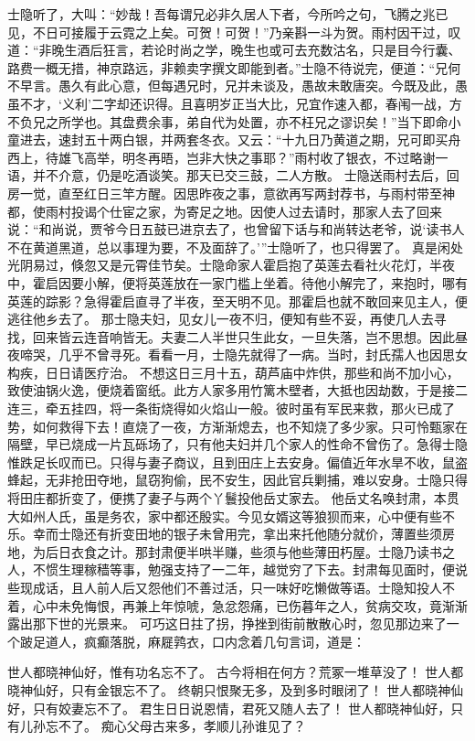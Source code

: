 \documentclass[12pt,oneside]{book}
\begin{document}
士隐听了，大叫：“妙哉！吾每谓兄必非久居人下者，今所吟之句，飞腾之兆已见，不日可接履于云霓之上矣。可贺！可贺！”乃亲斟一斗为贺。雨村因干过，叹道：“非晚生酒后狂言，若论时尚之学，晚生也或可去充数沽名，只是目今行囊、路费一概无措，神京路远，非赖卖字撰文即能到者。”士隐不待说完，便道：“兄何不早言。愚久有此心意，但每遇兄时，兄并未谈及，愚故未敢唐突。今既及此，愚虽不才，‘义利’二字却还识得。且喜明岁正当大比，兄宜作速入都，春闱一战，方不负兄之所学也。其盘费余事，弟自代为处置，亦不枉兄之谬识矣！”当下即命小童进去，速封五十两白银，并两套冬衣。又云：“十九日乃黄道之期，兄可即买舟西上，待雄飞高举，明冬再晤，岂非大快之事耶？”雨村收了银衣，不过略谢一语，并不介意，仍是吃酒谈笑。那天已交三鼓，二人方散。
士隐送雨村去后，回房一觉，直至红日三竿方醒。因思昨夜之事，意欲再写两封荐书，与雨村带至神都，使雨村投谒个仕宦之家，为寄足之地。因使人过去请时，那家人去了回来说：“和尚说，贾爷今日五鼓已进京去了，也曾留下话与和尚转达老爷，说‘读书人不在黄道黑道，总以事理为要，不及面辞了。’”士隐听了，也只得罢了。
真是闲处光阴易过，倏忽又是元霄佳节矣。士隐命家人霍启抱了英莲去看社火花灯，半夜中，霍启因要小解，便将英莲放在一家门槛上坐着。待他小解完了，来抱时，哪有英莲的踪影？急得霍启直寻了半夜，至天明不见。那霍启也就不敢回来见主人，便逃往他乡去了。
那士隐夫妇，见女儿一夜不归，便知有些不妥，再使几人去寻找，回来皆云连音响皆无。夫妻二人半世只生此女，一旦失落，岂不思想。因此昼夜啼哭，几乎不曾寻死。看看一月，士隐先就得了一病。当时，封氏孺人也因思女构疾，日日请医疗治。
不想这日三月十五，葫芦庙中炸供，那些和尚不加小心，致使油锅火逸，便烧着窗纸。此方人家多用竹篱木壁者，大抵也因劫数，于是接二连三，牵五挂四，将一条街烧得如火焰山一般。彼时虽有军民来救，那火已成了势，如何救得下去！直烧了一夜，方渐渐熄去，也不知烧了多少家。只可怜甄家在隔壁，早已烧成一片瓦砾场了，只有他夫妇并几个家人的性命不曾伤了。急得士隐惟跌足长叹而已。只得与妻子商议，且到田庄上去安身。偏值近年水旱不收，鼠盗蜂起，无非抢田夺地，鼠窃狗偷，民不安生，因此官兵剿捕，难以安身。士隐只得将田庄都折变了，便携了妻子与两个丫鬟投他岳丈家去。
他岳丈名唤封肃，本贯大如州人氏，虽是务农，家中都还殷实。今见女婿这等狼狈而来，心中便有些不乐。幸而士隐还有折变田地的银子未曾用完，拿出来托他随分就价，薄置些须房地，为后日衣食之计。那封肃便半哄半赚，些须与他些薄田朽屋。士隐乃读书之人，不惯生理稼穑等事，勉强支持了一二年，越觉穷了下去。封肃每见面时，便说些现成话，且人前人后又怨他们不善过活，只一味好吃懒做等语。士隐知投人不着，心中未免悔恨，再兼上年惊唬，急忿怨痛，已伤暮年之人，贫病交攻，竟渐渐露出那下世的光景来。
可巧这日拄了拐，挣挫到街前散散心时，忽见那边来了一个跛足道人，疯癫落脱，麻屣鹑衣，口内念着几句言词，道是：

世人都晓神仙好，惟有功名忘不了。
古今将相在何方？荒冢一堆草没了！
世人都晓神仙好，只有金银忘不了。
终朝只恨聚无多，及到多时眼闭了！
世人都晓神仙好，只有姣妻忘不了。
君生日日说恩情，君死又随人去了！
世人都晓神仙好，只有儿孙忘不了。
痴心父母古来多，孝顺儿孙谁见了？
\end{document}
